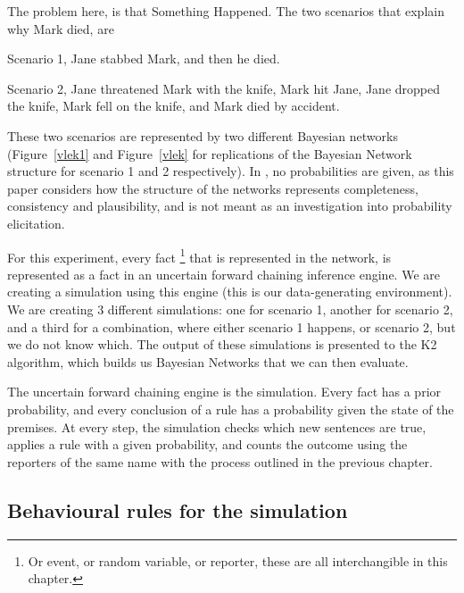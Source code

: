 The problem here, is that Something Happened. The two scenarios that explain why Mark died, are

Scenario 1, Jane stabbed Mark, and then he died. 

Scenario 2, Jane threatened Mark with the knife, Mark hit Jane, Jane dropped the knife, Mark fell on the knife, and Mark died by accident. 

These two scenarios are represented by two different Bayesian networks (Figure~\ref{vlek1} and Figure~\ref{vlek} for replications of the Bayesian Network structure for scenario 1 and 2 respectively). In \citet{Vlek2015}, no probabilities are given, as this paper considers how the structure of the networks represents completeness, consistency and plausibility, and is not meant as an investigation into probability elicitation.

For this experiment, every fact \footnote{Or event, or random variable, or reporter, these are all interchangible in this chapter.} that is represented in the network, is represented as a fact in an uncertain forward chaining inference engine. We are creating a simulation using this engine (this is our data-generating environment). We are creating 3 different simulations: one for scenario 1, another for scenario 2, and a third for a combination, where either scenario 1 happens, or scenario 2, but we do not know which. The output of these simulations is presented to the K2 algorithm, which builds us Bayesian Networks that we can then evaluate.

The uncertain forward chaining engine is the simulation. Every fact has a prior probability, and every conclusion of a rule has a probability given the state of the premises. At every step, the simulation checks which new sentences are true, applies a rule with a given probability, and counts the outcome using the reporters of the same name with the process outlined in the previous chapter.

\subsection{Behavioural rules for the simulation}

